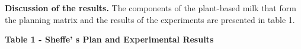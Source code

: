 {\bfseries Discussion of the results.} The components of the plant-based
milk that form the planning matrix and the results of the experiments
are presented in table 1.

{\bfseries Table 1 - Sheffe' s Plan and Experimental
Results}

